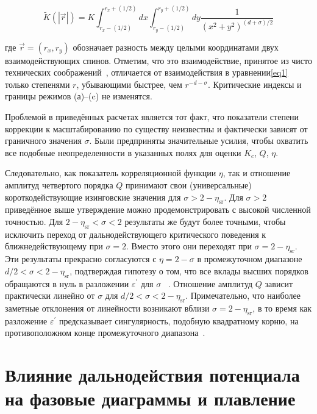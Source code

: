 \begin{equation}
  \tilde{K}(|\vec{r}|)=K \int_{r_{x}-(1 / 2)}^{r_{x}+(1 / 2)} d x \int_{r_{y}-(1 / 2)}^{r_{y}+(1 / 2)} d y \frac{1}{\left(x^{2}+y^{2}\right)^{(d+\sigma) / 2}}
\end{equation}

где $\vec r=\left(r_{x}, r_{y}\right)$ обозначает разность между целыми координатами двух взаимодействующих спинов. 
Отметим, что это взаимодействие, принятое из чисто технических соображений~\cite{10.1142/S0129183195000265}, отличается от взаимодействия в уравнении\ref{eq1} только степенями $r$, убывающими быстрее, чем $r^{-d-\sigma}$.
Критические индексы и границы режимов (а)–(c) не изменятся.

Проблемой в приведённых расчетах является тот факт, что показатели степени коррекции к масштабированию по существу неизвестны и фактически зависят от граничного значения $\sigma$. 
Были предприняты значительные усилия, чтобы охватить все подобные неопределенности в указанных полях для оценки $K_{c}$, $Q$, $\eta$.

Следовательно, как показатель корреляционной функции $\eta$, так и отношение амплитуд четвертого порядка $Q$ принимают свои (универсальные) короткодействующие изинговские значения для $\sigma>2-\eta_{\mathrm{sr}}$. 
Для $\sigma>2$ приведённое выше утверждение можно продемонстрировать с высокой численной точностью. Для $2-\eta_{\mathrm{sr}}<\sigma<2$ результаты же будут более точными, чтобы исключить переход от дальнодействующего критического поведения к ближнедействующему при $\sigma=2$.
Вместо этого они переходят при $\sigma=2-\eta_{\mathrm{sr}}$. 
Эти результаты прекрасно согласуются с $\eta=2-\sigma$ в промежуточном диапазоне $d/2<\sigma<2-\eta_{\mathrm{sr}}$, подтверждая гипотезу о том, что все вклады высших порядков обращаются в нуль в разложении $\varepsilon^{\prime}$ для $\sigma$ ~\cite{10.1103/PhysRevLett.29.917}.
Отношение амплитуд $Q$ зависит практически линейно от $\sigma$ для $d/2<\sigma<2-\eta_{\mathrm{sr}}$.
Примечательно, что наиболее заметные отклонения от линейности возникают вблизи $\sigma=2-\eta_{\mathrm{sr}}$, в то время как разложение $\varepsilon^{\prime}$ предсказывает сингулярность, подобную квадратному корню, на противоположном конце промежуточного диапазона~\cite{10.1103/PhysRevE.60.7558}.


\section{Влияние дальнодействия потенциала на фазовые диаграммы и плавление}


